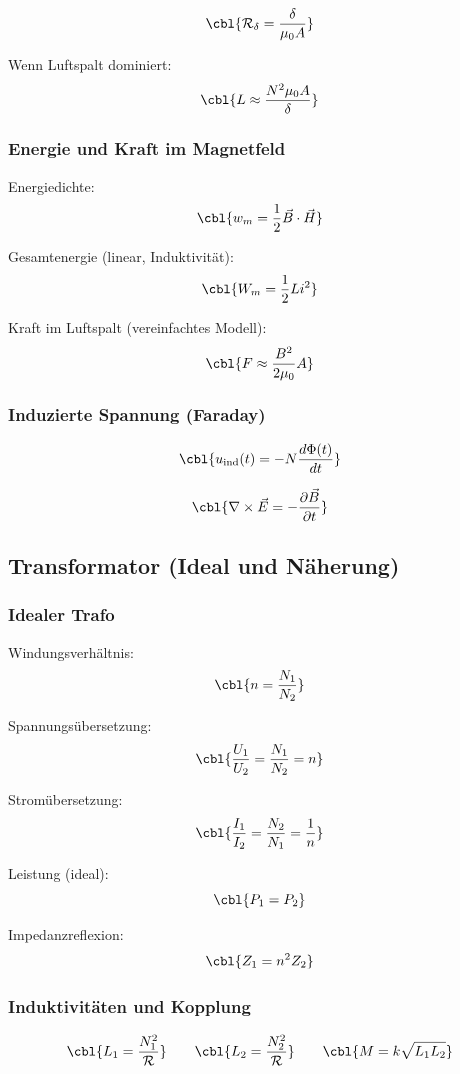 \[
\cbl{\mathcal{R}_\delta = \frac{\delta}{\mu_0 A}}
\]

Wenn Luftspalt dominiert:
\[
\cbl{L \approx \frac{N^2 \mu_0 A}{\delta}}
\]

\subsubsection{Energie und Kraft im Magnetfeld}

Energiedichte:
\[
\cbl{w_m = \frac{1}{2} \vec{B}\cdot \vec{H}}
\]

Gesamtenergie (linear, Induktivität):
\[
\cbl{W_m = \frac{1}{2} L i^2}
\]

Kraft im Luftspalt (vereinfachtes Modell):
\[
\cbl{F \approx \frac{B^2}{2\mu_0} A}
\]

\subsubsection{Induzierte Spannung (Faraday)}

\[
\cbl{u_{\mathrm{ind}}(t) = - N \frac{d\Phi(t)}{dt}}
\]

\[
\cbl{\nabla \times \vec{E} = -\frac{\partial \vec{B}}{\partial t}}
\]

\subsection{Transformator (Ideal und Näherung)}

\subsubsection{Idealer Trafo}

Windungsverhältnis:
\[
\cbl{n = \frac{N_1}{N_2}}
\]

Spannungsübersetzung:
\[
\cbl{\frac{U_1}{U_2} = \frac{N_1}{N_2} = n}
\]

Stromübersetzung:
\[
\cbl{\frac{I_1}{I_2} = \frac{N_2}{N_1} = \frac{1}{n}}
\]

Leistung (ideal):
\[
\cbl{P_1 = P_2}
\]

Impedanzreflexion:
\[
\cbl{Z_1 = n^2 Z_2}
\]

\subsubsection{Induktivitäten und Kopplung}

\[
\cbl{L_1 = \frac{N_1^2}{\mathcal{R}}}
\qquad
\cbl{L_2 = \frac{N_2^2}{\mathcal{R}}}
\qquad
\cbl{M = k \sqrt{L_1 L_2}}
\]

